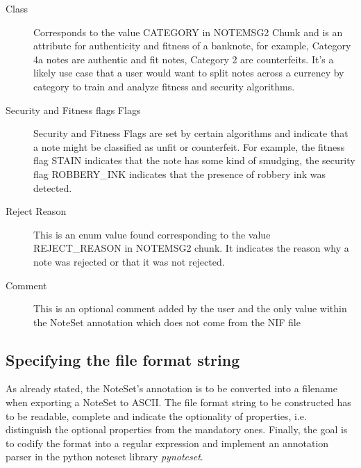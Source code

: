 \begin{description}
\item[Class] Corresponds to the value CATEGORY in NOTEMSG2 Chunk and is an attribute for authenticity and fitness of a banknote, for example, Category 4a notes are authentic and fit notes, Category 2 are counterfeits. It's a likely use case that a user would want to split notes across a currency by category to train and analyze fitness and security algorithms. 
\item[Security and Fitness flags Flags] Security and Fitness Flags are set by certain algorithms and indicate that a note might be classified as unfit or counterfeit. For example, the fitness flag STAIN indicates that the note has some kind of smudging, the security flag ROBBERY\_INK indicates that the presence of robbery ink was detected. 
\item[Reject Reason] This is an enum value found corresponding to the value REJECT\_REASON in NOTEMSG2 chunk. It indicates the reason why a note was rejected or that it was not rejected.
\item [Comment] This is an optional comment added by the user and the only value within the NoteSet annotation which does not come from the NIF file
\end{description}

\subsection{Specifying the file format string}
As already stated, the NoteSet's annotation is to be converted into a filename when exporting a NoteSet to ASCII. The file format string to be constructed has to be readable, complete and indicate the optionality of properties, i.e. distinguish the optional properties from the mandatory ones. Finally, the goal is to codify the format into a regular expression and implement an annotation parser in the python noteset library \emph{pynoteset}.
